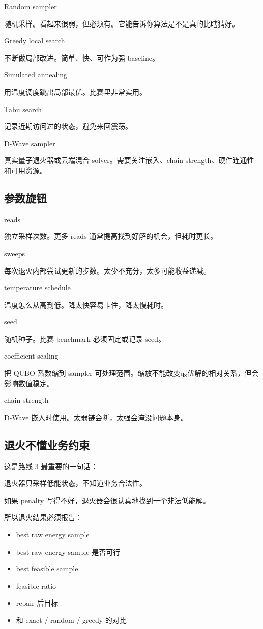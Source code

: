 \documentclass[UTF8,12pt,a4paper]{ctexart}
\begin{document}
Random sampler

随机采样。看起来很弱，但必须有。它能告诉你算法是不是真的比瞎猜好。

Greedy local search

不断做局部改进。简单、快、可作为强 baseline。

Simulated annealing

用温度调度跳出局部最优。比赛里非常实用。

Tabu search

记录近期访问过的状态，避免来回震荡。

D-Wave sampler

真实量子退火器或云端混合 solver。需要关注嵌入、chain strength、硬件连通性和可用资源。

\subsection*{参数旋钮}

reads

独立采样次数。更多 reads 通常提高找到好解的机会，但耗时更长。

sweeps

每次退火内部尝试更新的步数。太少不充分，太多可能收益递减。

temperature schedule

温度怎么从高到低。降太快容易卡住，降太慢耗时。

seed

随机种子。比赛 benchmark 必须固定或记录 seed。

coefficient scaling

把 QUBO 系数缩到 sampler 可处理范围。缩放不能改变最优解的相对关系，但会影响数值稳定。

chain strength

D-Wave 嵌入时使用。太弱链会断，太强会淹没问题本身。

\subsection*{退火不懂业务约束}

这是路线 3 最重要的一句话：

\begin{GuideVerbatim}
退火器只采样低能状态，不知道业务合法性。
\end{GuideVerbatim}

如果 penalty 写得不好，退火器会很认真地找到一个非法低能解。

所以退火结果必须报告：

\begin{itemize}
\item best raw energy sample
\item best raw energy sample 是否可行
\item best feasible sample
\item feasible ratio
\item repair 后目标
\item 和 exact / random / greedy 的对比
\end{itemize}
\end{document}
